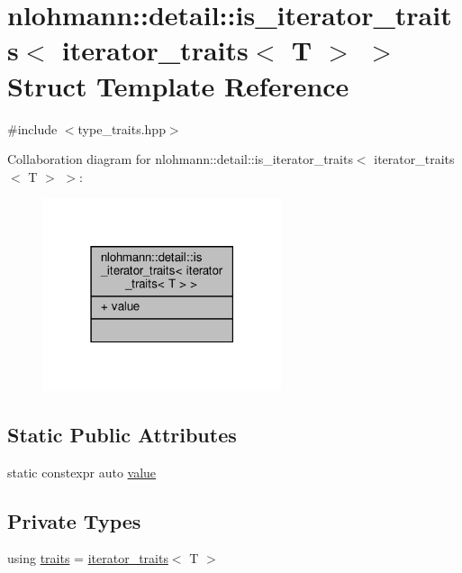 \hypertarget{structnlohmann_1_1detail_1_1is__iterator__traits_3_01iterator__traits_3_01_t_01_4_01_4}{}\section{nlohmann\+:\+:detail\+:\+:is\+\_\+iterator\+\_\+traits$<$ iterator\+\_\+traits$<$ T $>$ $>$ Struct Template Reference}
\label{structnlohmann_1_1detail_1_1is__iterator__traits_3_01iterator__traits_3_01_t_01_4_01_4}


{\ttfamily \#include $<$type\+\_\+traits.\+hpp$>$}



Collaboration diagram for nlohmann\+:\+:detail\+:\+:is\+\_\+iterator\+\_\+traits$<$ iterator\+\_\+traits$<$ T $>$ $>$\+:\nopagebreak
\begin{figure}[H]
\begin{center}
\leavevmode
\includegraphics[width=198pt]{structnlohmann_1_1detail_1_1is__iterator__traits_3_01iterator__traits_3_01_t_01_4_01_4__coll__graph}
\end{center}
\end{figure}
\subsection*{Static Public Attributes}
\begin{DoxyCompactItemize}
\item 
static constexpr auto \hyperlink{structnlohmann_1_1detail_1_1is__iterator__traits_3_01iterator__traits_3_01_t_01_4_01_4_ac2711760b352b8921accc6609957dc90}{value}
\end{DoxyCompactItemize}
\subsection*{Private Types}
\begin{DoxyCompactItemize}
\item 
using \hyperlink{structnlohmann_1_1detail_1_1is__iterator__traits_3_01iterator__traits_3_01_t_01_4_01_4_a1cbceaaa83a3ad294c3cb66b9df48e78}{traits} = \hyperlink{structnlohmann_1_1detail_1_1iterator__traits}{iterator\+\_\+traits}$<$ T $>$
\end{DoxyCompactItemize}



